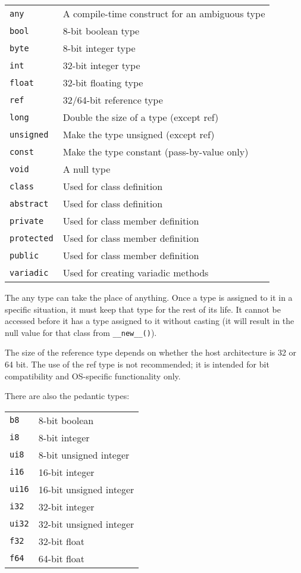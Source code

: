 \documentclass[10pt,a4paper]{article}
\begin{document}
\begin{tabular}{l l}
\verb|any| & A compile-time construct for an ambiguous type \\
\verb|bool| & 8-bit boolean type \\
\verb|byte| & 8-bit integer type \\
\verb|int| & 32-bit integer type \\
\verb|float| & 32-bit floating type \\
\verb|ref| & 32/64-bit reference type \\
\verb|long| & Double the size of a type (except ref) \\
\verb|unsigned| & Make the type unsigned (except ref) \\
\verb|const| & Make the type constant (pass-by-value only) \\
\verb|void| & A null type \\
\verb|class| & Used for class definition \\
\verb|abstract| & Used for class definition \\
\verb|private| & Used for class member definition \\
\verb|protected| & Used for class member definition \\
\verb|public| & Used for class member definition \\
\verb|variadic| & Used for creating variadic methods \\
\end{tabular}

The any type can take the place of anything. Once a type is assigned to it in a specific situation, it must keep that type for the rest of its life. It cannot be accessed before it has a type assigned to it without casting (it will result in the null value for that class from \verb|__new__()|). 

The size of the reference type depends on whether the host architecture is 32 or 64 bit. The use of the ref type is not recommended; it is intended for bit compatibility and OS-specific functionality only. 

There are also the pedantic types:

\begin{tabular}{l l}
\verb|b8| & 8-bit boolean \\
\verb|i8| & 8-bit integer \\
\verb|ui8| & 8-bit unsigned integer \\
\verb|i16| & 16-bit integer \\
\verb|ui16| & 16-bit unsigned integer \\
\verb|i32| & 32-bit integer \\
\verb|ui32| & 32-bit unsigned integer \\
\verb|f32| & 32-bit float \\
\verb|f64| & 64-bit float \\
\end{tabular}
\end{document}
